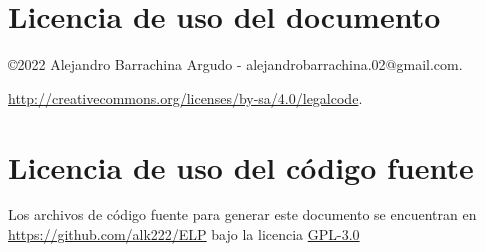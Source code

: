 \chapter*{Licencia de uso del documento}

\begin{flushright}
    \copyright  2022 Alejandro Barrachina Argudo - alejandrobarrachina.02@gmail.com.

    \doclicenseThis

    \url{http://creativecommons.org/licenses/by-sa/4.0/legalcode}.
\end{flushright}

\chapter*{Licencia de uso del código fuente}

Los archivos de código fuente para generar este documento se encuentran en \url{https://github.com/alk222/ELP} bajo la licencia \href{https://www.gnu.org/licenses/gpl-3.0.html}{GPL-3.0}
